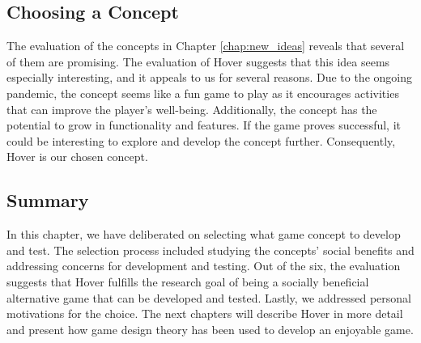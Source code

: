 \subsection{Choosing a Concept}
The evaluation of the concepts in Chapter \ref{chap:new_ideas} reveals that several of them are promising. The evaluation of Hover suggests that this idea seems especially interesting, and it appeals to us for several reasons. Due to the ongoing pandemic, the concept seems like a fun game to play as it encourages activities that can improve the player’s well-being. Additionally, the concept has the potential to grow in functionality and features. If the game proves successful, it could be interesting to explore and develop the concept further. Consequently, Hover is our chosen concept.

\subsection{Summary}
In this chapter, we have deliberated on selecting what game concept to develop and test. The selection process included studying the concepts’ social benefits and addressing concerns for development and testing. Out of the six, the evaluation suggests that Hover fulfills the research goal of being a socially beneficial alternative game that can be developed and tested. Lastly, we addressed personal motivations for the choice. The next chapters will describe Hover in more detail and present how game design theory has been used to develop an enjoyable game.